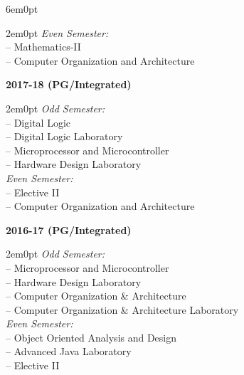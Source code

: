 \documentclass[11pt,a4paper]{moderncv}
\begin{document}
\begin{adjustwidth}{6em}{0pt}
\begin{adjustwidth}{2em}{0pt}
		\textit{Even Semester:} \\
		\hspace*{1.5em}-- Mathematics-II \\
		\hspace*{1.5em}-- Computer Organization and Architecture \\
	\end{adjustwidth}
	
	
	\textbf{2017-18 (PG/Integrated)}
	
	\begin{adjustwidth}{2em}{0pt}
		\textit{Odd Semester:} \\
		\hspace*{1.5em}-- Digital Logic \\
		\hspace*{1.5em}-- Digital Logic Laboratory \\
		\hspace*{1.5em}-- Microprocessor and Microcontroller \\
		\hspace*{1.5em}-- Hardware Design Laboratory \\
		
		\textit{Even Semester:} \\
		\hspace*{1.5em}-- Elective II \\
		\hspace*{1.5em}-- Computer Organization and Architecture \\
	\end{adjustwidth}
	
	
	\textbf{2016-17 (PG/Integrated)}
	
	\begin{adjustwidth}{2em}{0pt}
		\textit{Odd Semester:} \\
		\hspace*{1.5em}-- Microprocessor and Microcontroller \\
		\hspace*{1.5em}-- Hardware Design Laboratory \\
		\hspace*{1.5em}-- Computer Organization \& Architecture \\
		\hspace*{1.5em}-- Computer Organization \& Architecture Laboratory \\
		
		\textit{Even Semester:} \\
		\hspace*{1.5em}-- Object Oriented Analysis and Design \\
		\hspace*{1.5em}-- Advanced Java Laboratory \\
		\hspace*{1.5em}-- Elective II \\
	\end{adjustwidth}
	

\end{adjustwidth}
\end{document}
